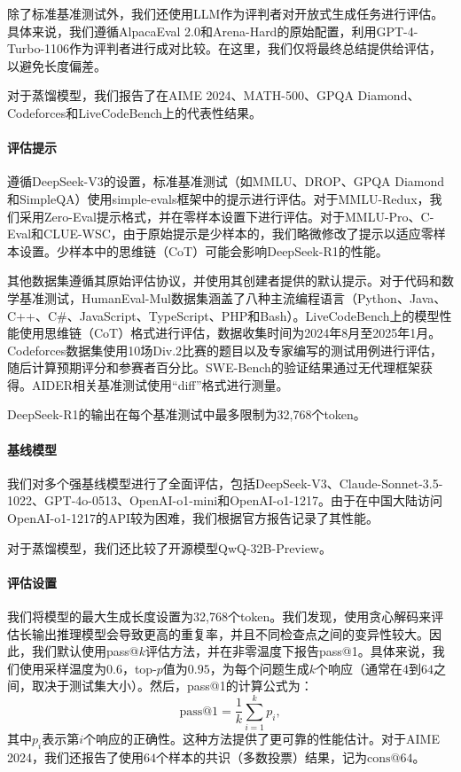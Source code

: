 \documentclass[lang=cn,a4paper,newtx]{elegantpaper}
\newcommand{\dsri}{DeepSeek-R1}
\begin{document}
除了标准基准测试外，我们还使用LLM作为评判者对开放式生成任务进行评估。具体来说，我们遵循AlpacaEval 2.0和Arena-Hard的原始配置，利用GPT-4-Turbo-1106作为评判者进行成对比较。在这里，我们仅将最终总结提供给评估，以避免长度偏差。

对于蒸馏模型，我们报告了在AIME 2024、MATH-500、GPQA Diamond、Codeforces和LiveCodeBench上的代表性结果。

\paragraph{评估提示} 遵循DeepSeek-V3的设置，标准基准测试（如MMLU、DROP、GPQA Diamond和SimpleQA）使用simple-evals框架中的提示进行评估。对于MMLU-Redux，我们采用Zero-Eval提示格式，并在零样本设置下进行评估。对于MMLU-Pro、C-Eval和CLUE-WSC，由于原始提示是少样本的，我们略微修改了提示以适应零样本设置。少样本中的思维链（CoT）可能会影响\dsri{}的性能。

其他数据集遵循其原始评估协议，并使用其创建者提供的默认提示。对于代码和数学基准测试，HumanEval-Mul数据集涵盖了八种主流编程语言（Python、Java、C++、C\#、JavaScript、TypeScript、PHP和Bash）。LiveCodeBench上的模型性能使用思维链（CoT）格式进行评估，数据收集时间为2024年8月至2025年1月。Codeforces数据集使用10场Div.2比赛的题目以及专家编写的测试用例进行评估，随后计算预期评分和参赛者百分比。SWE-Bench的验证结果通过无代理框架获得。AIDER相关基准测试使用“diff”格式进行测量。

\dsri{}的输出在每个基准测试中最多限制为32,768个token。

\paragraph{基线模型} 我们对多个强基线模型进行了全面评估，包括DeepSeek-V3、Claude-Sonnet-3.5-1022、GPT-4o-0513、OpenAI-o1-mini和OpenAI-o1-1217。由于在中国大陆访问OpenAI-o1-1217的API较为困难，我们根据官方报告记录了其性能。

对于蒸馏模型，我们还比较了开源模型QwQ-32B-Preview。

\paragraph{评估设置}  
我们将模型的最大生成长度设置为32,768个token。我们发现，使用贪心解码来评估长输出推理模型会导致更高的重复率，并且不同检查点之间的变异性较大。因此，我们默认使用pass@$k$评估方法，并在非零温度下报告pass@1。具体来说，我们使用采样温度为$0.6$，top-$p$值为$0.95$，为每个问题生成$k$个响应（通常在$4$到$64$之间，取决于测试集大小）。然后，pass@1的计算公式为：
\[
\text{pass@1} = \frac{1}{k} \sum_{i=1}^{k} p_i,
\]
其中$p_i$表示第$i$个响应的正确性。这种方法提供了更可靠的性能估计。对于AIME 2024，我们还报告了使用$64$个样本的共识（多数投票）结果，记为$\text{cons}@64$。
\end{document}
